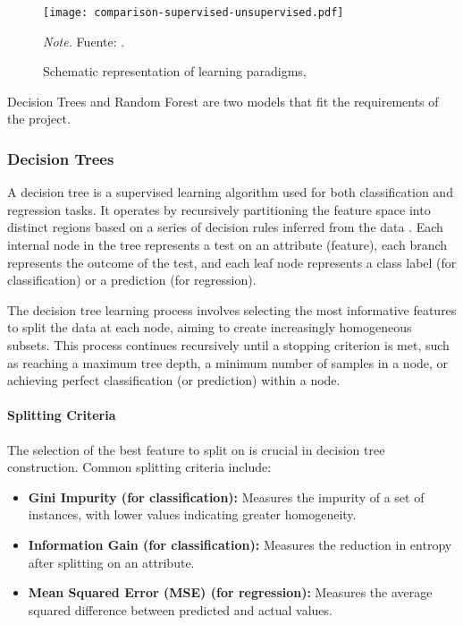 \begin{figure}
    \centering
    \caption{Schematic representation of learning paradigms, } \label{fig:mlComparison}
    \texttt{[image: comparison-supervised-unsupervised.pdf]}

    \vspace{0.5em}
    \begin{minipage}{\textwidth}
        \small\textit{Note.} Fuente: \textcite{morimoto2021}.
    \end{minipage}
\end{figure}

Decision Trees and Random Forest are two models that fit the requirements of the project.

\subsubsection{Decision Trees}
A decision tree is a supervised learning algorithm used for both classification and regression tasks.
It operates by recursively partitioning the feature space into distinct regions based on a series of decision rules inferred from the data \parencite{quinlan1986induction}.
Each internal node in the tree represents a test on an attribute (feature), each branch represents the outcome of the test, and each leaf node represents a class label (for classification) or a prediction (for regression).

The decision tree learning process involves selecting the most informative features to split the data at each node, aiming to create increasingly homogeneous subsets.
This process continues recursively until a stopping criterion is met, such as reaching a maximum tree depth, a minimum number of samples in a node, or achieving perfect classification (or prediction) within a node.

\paragraph{Splitting Criteria}
The selection of the best feature to split on is crucial in decision tree construction.
Common splitting criteria include:

\begin{itemize}
    \item \textbf{Gini Impurity (for classification):} Measures the impurity of a set of instances, with lower values indicating greater homogeneity.
    \item \textbf{Information Gain (for classification):} Measures the reduction in entropy after splitting on an attribute.
    \item \textbf{Mean Squared Error (MSE) (for regression):} Measures the average squared difference between predicted and actual values.
\end{itemize}

